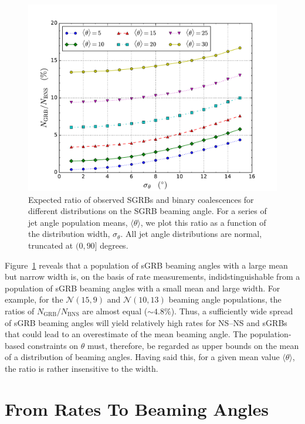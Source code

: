\documentclass[twocolumn,nofootinbib]{revtex4-1}
\newcommand{\BNS}{\ac{NS}--\ac{NS}\xspace}
\begin{document}
\begin{figure}
    \centering
    \includegraphics[width=\linewidth]{figure1.pdf}
    \caption{Expected ratio of observed SGRBs and binary coalescences for different distributions on the SGRB beaming angle.
        For a series of jet angle population means, $\langle \theta \rangle$, we plot this ratio as a function of the distribution width, $\sigma_{\theta}$.
        All jet angle distributions are normal, truncated at $(0, 90]$ degrees.
        \label{fig:thetapop}}
\end{figure}

Figure~\ref{fig:thetapop} reveals that a population of \ac{sGRB} beaming angles with a large mean but narrow width is, on the basis of rate measurements, indidstinguishable from a population of \ac{sGRB} beaming angles with a small mean and large width.
For example, for the ${\mathcal N}(15,9)$ and ${\mathcal N}(10,13)$ beaming angle populations, the ratios of $N_{\mathrm{GRB}}/N_{\mathrm{BNS}}$ are almost equal ($\sim 4.8\%$).
Thus, a sufficiently wide spread of \ac{sGRB} beaming angles will yield relatively high rates for \BNS and \acp{sGRB} that could lead to an overestimate of the mean beaming angle.
The population-based constraints on $\theta$ must, therefore, be regarded as upper bounds on the mean of a distribution of beaming angles.
Having said this, for a given mean value $\langle \theta \rangle$, the ratio is rather insensitive to the width.


\section{From Rates To Beaming Angles}
\end{document}
